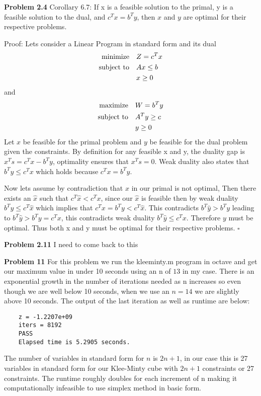 \documentclass{article}
\begin{document}
\textbf{Problem 2.4} Corollary 6.7: If x is a feasible solution to the primal, y is a feasible solution to the dual,
and $c^Tx = b^Ty$, then $x$ and $y$ are optimal for their respective problems.

Proof: Lets consider a Linear Program in standard form and its dual
\begin{align*}
    \text{minimize} &\null \quad Z = c^Tx \\
    \text{subject to} &\null \quad Ax \leq b \\
     &\null \quad x \geq 0
\end{align*}
and
\begin{align*}
    \text{maximize} &\null \quad W = b^Ty \\
    \text{subject to} &\null \quad A^Ty \geq c \\
     &\null \quad y \geq 0
\end{align*}
Let $x$ be feasible for the primal problem and $y$ be feasible for the dual problem given the constraints. By definition for any feasible x and y, the duality gap is $x^Ts = c^Tx - b^Ty$, optimality ensures that $x^Ts = 0$. Weak duality also states that $b^Ty \leq c^Tx$ which holds because $c^Tx = b^Ty$. 

Now lets assume by contradiction that $x$ in our primal is not optimal, Then there exists an $\hat{x}$ such that $c^T\hat{x} < c^Tx$, since our $\hat{x}$ is feasible then by weak duality $b^Ty \leq c^T\hat{x}$ which implies that $c^Tx = b^Ty < c^T\hat{x}$. This contradicts $b^T\hat{y} > b^Ty$ leading to $b^T\hat{y} > b^Ty = c^Tx$, this contradicts weak duality $b^T\hat{y} \leq c^Tx$. Therefore $y$ must be optimal. Thus both x and y must be optimal for their respective problems. $\square$
\newline

\textbf{Problem 2.11} I need to come back to this

\textbf{Problem 11} For this problem we run the kleeminty.m program in octave and get our maximum value in under 10 seconds using an n of $13$ in my case. There is an exponential growth in the number of iterations needed as n increases so even though we are well below 10 seconds, when we use an $n=14$ we are slightly above 10 seconds. The output of the last iteration as well as runtime are below:

\begin{lstlisting}
    z = -1.2207e+09
    iters = 8192
    PASS
    Elapsed time is 5.2905 seconds.
\end{lstlisting}
The number of variables in standard form for $n$ is $2n+1$, in our case this is 27 variables in standard form for our Klee-Minty cube with $2n+1$ constraints or 27 constraints. The runtime roughly doubles for each increment of n making it computationally  infeasible to use simplex method in basic form.
\end{document}

